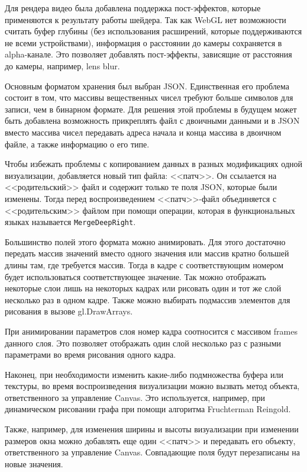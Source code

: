 Для рендера видео была добавлена поддержка пост-эффектов, которые применяются к результату работы шейдера. Так как WebGL нет возможности считать буфер глубины (без использования расширений, которые поддерживаются не всеми устройствами), информация о расстоянии до камеры сохраняется в alpha-канале. Это позволяет добавлять пост-эффекты, зависящие от расстояния до камеры, например, lens blur.

Основным форматом хранения был выбран JSON. Единственная его проблема состоит в том, что массивы вещественных чисел требуют больше символов для записи, чем в бинарном формате. Для решения этой проблемы в будущем может быть добавлена возможность прикреплять файл с двоичными данными и в JSON вместо массива чисел передавать адреса начала и конца массива в двоичном файле, а также информацию о его типе.

Чтобы избежать проблемы с копированием данных в разных модификациях одной визуализации, добавляется новый тип файла: <<патч>>. Он ссылается на <<родительский>> файл и содержит только те поля JSON, которые были изменены. Тогда перед воспроизведением <<патч>>-файл объединяется с <<родительским>> файлом при помощи операции, которая в функциональных языках называется \texttt{MergeDeepRight}.

Большинство полей этого формата можно анимировать. Для этого достаточно передать массив значений вместо одного значения или массив кратно большей длины там, где требуется массив. Тогда в кадре с соответствующим номером будет использоваться соответствующее значение. Так можно отображать некоторые слои лишь на некоторых кадрах или рисовать один и тот же слой несколько раз в одном кадре. Также можно выбирать подмассив элементов для рисования в вызове gl.DrawArrays.

При анимировании параметров слоя номер кадра соотносится с массивом frames данного слоя. Это позволяет отображать один слой несколько раз с разными параметрами во время рисования одного кадра.

Наконец, при необходимости изменить какие-либо подмножества буфера или текстуры, во время воспроизведения визуализации можно вызвать метод объекта, ответственного за управление Canvas. Это используется, например, при динамическом рисовании графа при помощи алгоритма Fruchterman Reingold.

Также, например, для изменения ширины и высоты визуализации при изменении размеров окна можно добавлять еще один <<патч>> и передавать его объекту, ответственного за управление Canvas. Совпадающие поля будут перезаписаны на новые значения.

